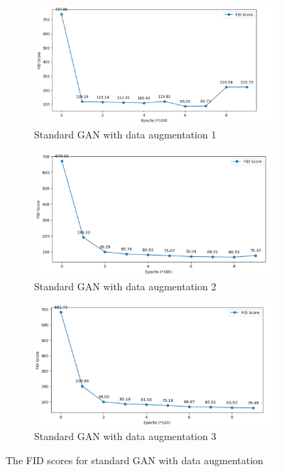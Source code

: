 \begin{figure}[H]
    \centering
    \begin{subfigure}[b]{\linewidth}
        \centering
        \includegraphics[width=0.84\linewidth]{./Images/standard_GAN_with_data_augementation1.jpg}
        \caption{Standard GAN with data augmentation 1}
        \label{fig:Dense}
    \end{subfigure}
    \vspace{0.05\linewidth} 
    \begin{subfigure}[b]{\linewidth}
        \centering
        \includegraphics[width=0.8\linewidth]{./Images/standard_GAN_with_data_augementation2.jpg}
        \caption{Standard GAN with data augmentation 2}
        \label{fig:Conv2DTranspose}
    \end{subfigure}
    \begin{subfigure}[b]{\linewidth}
        \centering
        \includegraphics[width=0.8\linewidth]{./Images/standard_GAN_with_data_augementation3.jpg}
        \caption{Standard GAN with data augmentation 3}
        \label{fig:Conv2DTranspose}
    \end{subfigure}
    \caption{The FID scores for standard GAN with data augmentation}
    \label{fig:combined}
\end{figure}



